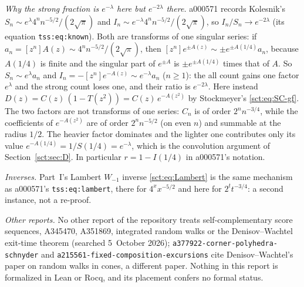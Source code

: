 \documentclass[11pt,letterpaper]{article}
\newcommand{\file}[1]{\nolinkurl{#1}}
\theoremstyle{definition}\newtheorem{remark}[theorem]{Remark}
\begin{document}
\emph{Why the strong fraction is $e^{-\lambda}$ here but $e^{-2\lambda}$ there.} a000571 records Kolesnik's $S_n\sim e^{\lambda}4^nn^{-5/2}/(2\sqrt\pi)$ and $I_n\sim e^{-\lambda}4^nn^{-5/2}/(2\sqrt\pi)$, so $I_n/S_n\to e^{-2\lambda}$ (its equation \texttt{tss:eq:known}). Both are transforms of one singular series: if $a_n=[z^n]A(z)\sim4^nn^{-5/2}/(2\sqrt\pi)$, then $[z^n]e^{\pm A(z)}\sim\pm e^{\pm A(1/4)}a_n$, because $A(1/4)$ is finite and the singular part of $e^{\pm A}$ is $\pm e^{\pm A(1/4)}$ times that of $A$. So $S_n\sim e^{\lambda}a_n$ and $I_n=-[z^n]e^{-A(z)}\sim e^{-\lambda}a_n$ ($n\ge1$): the all count gains one factor $e^{\lambda}$ and the strong count loses one, and their ratio is $e^{-2\lambda}$. Here instead $D(z)=C(z)\,(1-T(z^2))=C(z)\,e^{-A(z^2)}$ by Stockmeyer's \eqref{sct:eq:SC-gf}. The two factors are not transforms of one series: $C_n$ is of order $2^nn^{-3/4}$, while the coefficients of $e^{-A(z^2)}$ are of order $2^nn^{-5/2}$ (on even $n$) and summable at the radius $1/2$. The heavier factor dominates and the lighter one contributes only its value $e^{-A(1/4)}=1/S(1/4)=e^{-\lambda}$, which is the convolution argument of Section~\ref{sct:sec:D}. In particular $r=1-I(1/4)$ in a000571's notation.

\emph{Inverses.} Part~I's Lambert $W_{-1}$ inverse \eqref{sct:eq:Lambert} is the same mechanism as a000571's \texttt{tss:eq:lambert}, there for $4^xx^{-5/2}$ and here for $2^tt^{-3/4}$: a second instance, not a re-proof.

\emph{Other reports.} No other report of the repository treats self-complementary score sequences, A345470, A351869, integrated random walks or the Denisov--Wachtel exit-time theorem (searched 5~October 2026); \file{a377922-corner-polyhedra-schnyder} and \file{a215561-fixed-composition-excursions} cite Denisov--Wachtel's paper on random walks in cones, a different paper. Nothing in this report is formalized in Lean or Rocq, and its placement confers no formal status.
\clearpage
\end{document}
